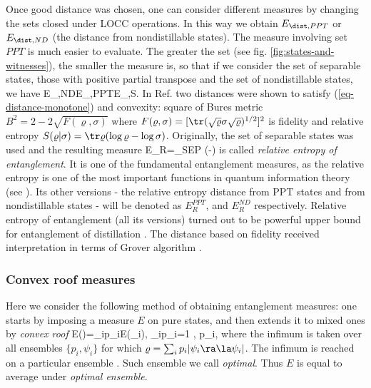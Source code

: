 \documentclass[twocolumn,aps,rmp]{revtex4}
\begin{document}
Once good distance was chosen, one can consider different measures by
changing the sets closed under LOCC operations. In this way we
obtain $E_{\dist,PPT}$ \cite{Rains2001} or $E_{\dist,ND}$ (the distance from nondistillable states). The measure
involving set $PPT$ is much easier to evaluate. The greater the set (see fig. \ref{fig:states-and-witnesses}), the smaller the measure is, so that if we consider the set of separable states, those with positive partial transpose and the set of nondistillable states, we have
\be
E_{\dist,ND}\leq E_{\dist,PPT}\leq  E_{\dist,S}.
\ee
In Ref. \cite{PlenioVedral1998} two distances were shown to satisfy
(\ref{eq-distance-monotone}) and convexity: square of Bures metric $B^2=2-2\sqrt
{F(\varrho,\sigma)}$ where $F(\varrho,\sigma)=[\tr(\sqrt\varrho
\sigma \sqrt\varrho)^{1/2}]^2$ is fidelity
\cite{Uhlmann-fidelity,Jozsa-fidelity} and relative entropy
$S(\varrho|\sigma)=\tr\varrho(\log\varrho-\log\sigma)$.
Originally,
the set of separable states was used and the resulting measure
\be
E_R=\inf_{\sigma\in \rm SEP} \tr\varrho(\log\varrho-\log\sigma)
\label{eq:relent}
\ee
is called {\it relative entropy of entanglement}.
It  is one of the fundamental entanglement measures, as the relative
entropy is one of the most important functions in quantum
information theory (see \cite{Vedral2002-rmp,SchumacherW2000-relent}).
Its other versions -  the relative entropy distance from PPT states  \cite{Rains2001}
and from nondistillable states \cite{Vedral-distbound} -
will be denoted as $E_{R}^{PPT}$, and $E_R^{ND}$ respectively.
Relative  entropy of entanglement (all its versions)
turned out to be powerful upper bound for entanglement of
distillation \cite{Rains2001}. The distance based
on fidelity received interpretation in terms of Grover algorithm
\cite{Biham2005-ent-Grov}.

\subsubsection{Convex roof measures}
\label{subsec:roof}

Here we consider the following method of obtaining entanglement
measures: one starts by imposing a measure $E$ on pure states, and
then extends it to mixed ones by {\it convex roof}
\cite{Uhlmann-roof} \be E(\varrho)=\inf \sum_ip_iE(\psi_i),\quad
\sum_ip_i=1 ,  p_i, \ee where the infimum is taken over all
ensembles $\{p_i,\psi_i\}$ for which
$\varrho=\sum_ip_i|\psi_i\ra\la\psi_i|$. The infimum is reached on a
particular ensemble \cite{Uhlmann-roof}. Such ensemble we call {\it
optimal}. Thus $E$ is equal to average under {\it optimal ensemble}.
\end{document}
